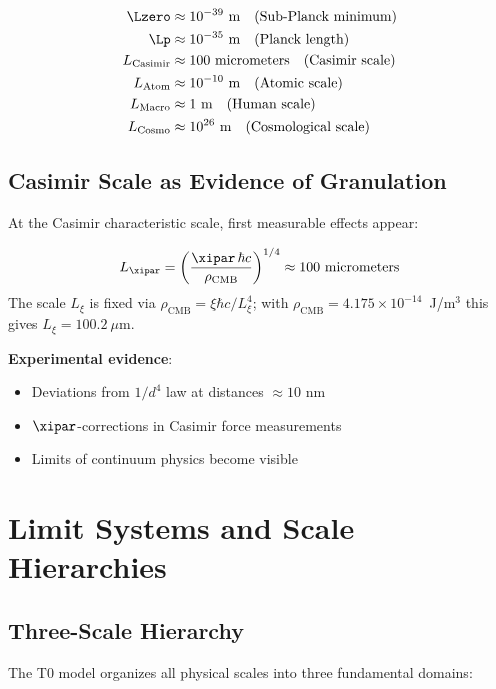 	\begin{align}
		\Lzero &\approx 10^{-39} \text{ m} \quad \text{(Sub-Planck minimum)} \\
		\Lp &\approx 10^{-35} \text{ m} \quad \text{(Planck length)} \\
		L_{\text{Casimir}} &\approx 100 \text{ micrometers} \quad \text{(Casimir scale)} \\
		L_{\text{Atom}} &\approx 10^{-10} \text{ m} \quad \text{(Atomic scale)} \\
		L_{\text{Macro}} &\approx 1 \text{ m} \quad \text{(Human scale)} \\
		L_{\text{Cosmo}} &\approx 10^{26} \text{ m} \quad \text{(Cosmological scale)}
	\end{align}
	
	\subsection{Casimir Scale as Evidence of Granulation}
	
	At the Casimir characteristic scale, first measurable effects appear:
	
	\begin{equation}
		L_{\xipar} = \left(\frac{\xipar\,\hbar c}{\rho_{\text{CMB}}}\right)^{1/4} \approx 100 \text{ micrometers}
	\end{equation}
	The scale $L_\xi$ is fixed via $\rho_{\text{CMB}} = \xi\hbar c/L_\xi^4$; with $\rho_{\text{CMB}} = 4.175 \times 10^{-14}$~J/m$^3$ this gives $L_\xi = 100.2~\mu$m.
	
	\textbf{Experimental evidence}:
	\begin{itemize}
		\item Deviations from $1/d^4$ law at distances $\approx 10$ nm
		\item $\xipar$-corrections in Casimir force measurements
		\item Limits of continuum physics become visible
	\end{itemize}
	
	\section{Limit Systems and Scale Hierarchies}
	
	\subsection{Three-Scale Hierarchy}
	
	The T0 model organizes all physical scales into three fundamental domains:
	
